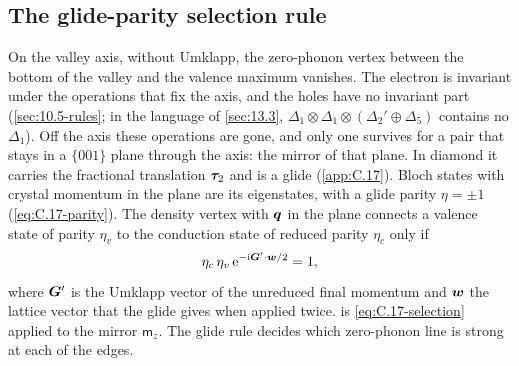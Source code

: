\subsection{The glide-parity selection rule}\label{sec:13.9-glide}

On the valley axis, without Umklapp, the zero-phonon vertex between the bottom of the valley and the valence maximum vanishes. The electron is invariant under the operations that fix the axis, and the holes have no invariant part (\cref{sec:10.5-rules}; in the language of \cref{sec:13.3}, $\Delta_1\otimes\Delta_1\otimes(\Delta_2'\oplus\Delta_5)$ contains no $\Delta_1$). Off the axis these operations are gone, and only one survives for a pair that stays in a $\{001\}$ plane through the axis: the mirror of that plane. In diamond it carries the fractional translation $\bm{\tau}_2$ and is a glide (\cref{app:C.17}). Bloch states with crystal momentum in the plane are its eigenstates, with a glide parity $\eta = \pm1$ (\cref{eq:C.17-parity}). The density vertex with $\bm{q}$ in the plane connects a valence state of parity $\eta_v$ to the conduction state of reduced parity $\eta_c$ only if
\begin{equation}
  \eta_c\,\eta_v\,\mathrm{e}^{-\mathrm{i}\bm{G}'\cdot\bm{w}/2} = 1 ,
  \label{eq:13.9-glide}
\end{equation}
where $\bm{G}'$ is the Umklapp vector of the unreduced final momentum and $\bm{w}$ the lattice vector that the glide gives when applied twice.  is \cref{eq:C.17-selection} applied to the mirror $\mathsf{m}_z$. The glide rule decides which zero-phonon line is strong at each of the edges.

